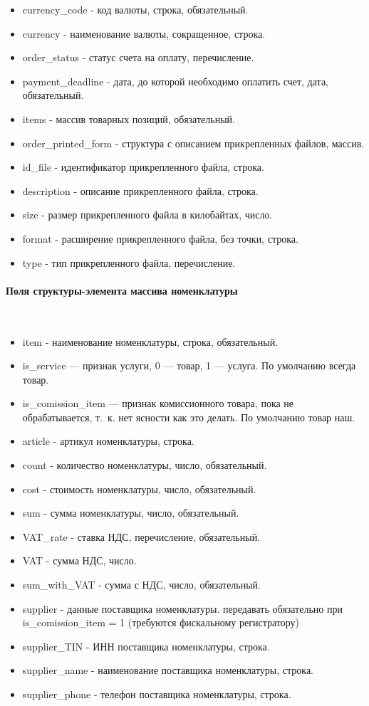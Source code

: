 \documentclass[11pt, a4paper]{article}
\begin{document}
\begin{itemize}
	\item currency\_code - код валюты, строка, обязательный.
	\item currency - наименование валюты, сокращенное, строка.
	\item order\_status - статус счета на оплату, перечисление.
	\item payment\_deadline - дата, до которой необходимо оплатить счет, дата, обязательный.
	\item items - массив товарных позиций, обязательный.
	\item order\_printed\_form - структура с описанием прикрепленных файлов, массив.
	\item id\_file - идентификатор прикрепленного файла, строка.
	\item description - описание прикрепленного файла, строка.
	\item size - размер прикрепленного файла в килобайтах, число.
	\item format - расширение прикрепленного файла, без точки, строка.
	\item type - тип прикрепленного файла, перечисление.
\end{itemize}

\paragraph{Поля структуры-элемента массива номенклатуры}\

\begin{itemize}
	\item item - наименование номенклатуры, строка, обязательный.
	\item is\_service — признак услуги, 0 — товар, 1 — услуга. По умолчанию всегда товар.
	\item is\_comission\_item — признак комиссионного товара, пока не обрабатывается, т. к. нет ясности как это делать. По умолчанию товар наш.
	\item article - артикул номенклатуры, строка.
	\item count - количество номенклатуры, число, обязательный.
	\item cost - стоимость номенклатуры, число, обязательный.
	\item sum - сумма номенклатуры, число, обязательный.
	\item VAT\_rate - ставка НДС, перечисление, обязательный.
	\item VAT - сумма НДС, число.
	\item sum\_with\_VAT - сумма с НДС, число, обязательный.
	\item supplier - данные поставщика номенклатуры. передавать обязательно при is\_comission\_item = 1 (требуются фискальному регистратору)
	\item supplier\_TIN - ИНН поставщика номенклатуры, строка.
	\item supplier\_name - наименование поставщика номенклатуры, строка.
	\item supplier\_phone - телефон поставщика номенклатуры, строка.
\end{itemize}
\end{document}
